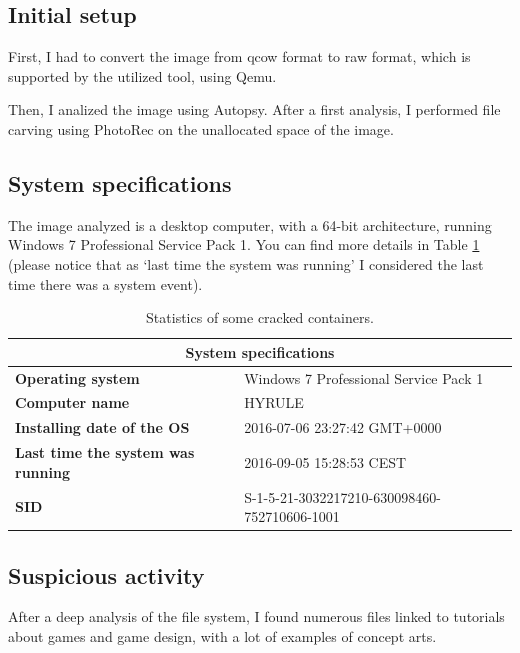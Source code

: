 \documentclass[12pt]{article}
\begin{document}
\subsection{Initial setup}

First, I had to convert the image from qcow format to raw format, which is supported by the utilized tool, using Qemu.

Then, I analized the image using Autopsy. After a first analysis, I performed file carving using PhotoRec on the unallocated space of the image.

\subsection{System specifications}

The image analyzed is a desktop computer, with a 64-bit architecture, running Windows 7 Professional Service Pack 1. 
You can find more details in Table \ref{table:stats} (please notice that as `last time the system was running' I considered the last time there was a system event).

\begin{table}[!ht]
    \centering
    \begin{tabular}{ll}
    \toprule
        \multicolumn{2}{c}{\textbf{System specifications}} \\
        \midrule
        \textbf{Operating system} & Windows 7 Professional Service Pack 1 \\
        \textbf{Computer name} & HYRULE \\
        \textbf{Installing date of the OS} & 2016-07-06 23:27:42 GMT+0000 \\
        \textbf{Last time the system was running} & 2016-09-05 15:28:53 CEST \\
        \textbf{SID} & S-1-5-21-3032217210-630098460-752710606-1001 \\
    \bottomrule
    \end{tabular}
    \caption{Statistics of some cracked containers.}
    \label{table:stats}
\end{table}

\subsection{Suspicious activity}

After a deep analysis of the file system, I found numerous files linked to tutorials about games and game design, with a lot of examples of concept arts. 
\end{document}
